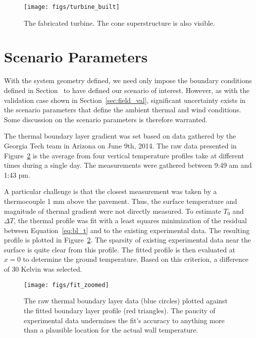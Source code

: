   \begin{figure}
   \centering
   \texttt{[image: figs/turbine\_built]}
   \caption{The fabricated turbine. The cone superstructure is also
   visible.} 
   \label{fig:turbine_built}
  \end{figure}


\section{Scenario Parameters}
\label{subsec:scenario_param}

With the system geometry defined, we need only impose the boundary
conditions defined in Section~\label{sec:bc} to have defined our
scenario of interest. However, as with the validation case shown in
Section~\ref{sec:field_val}, significant uncertainty exists in the
scenario parameters that define the ambient thermal and wind
conditions. Some discussion on the scenario parameters is therefore
warranted. 

The thermal boundary layer gradient was set based on data gathered by 
the Georgia Tech team in Arizona on June 9th, 2014. The raw data
presented in Figure~\ref{fig:thermal_profile_fit} is the average from
four vertical temperature profiles take at different times during a
single day. The measurements were gathered between 9:49 am and 1:43
pm\cite{ann_comm}.  

A particular challenge is that the closest measurement was taken by a 
thermocouple 1 mm above the pavement. Thus, the surface temperature and
magnitude of thermal gradient were not directly measured. To estimate
$T_0$ and $\Delta T$, the thermal profile was fit with a least squares
minimization of the residual between Equation~\ref{eq:bl_t} and to the
existing experimental data. The resulting profile is plotted in
Figure~\ref{fig:thermal_profile_fit}. The sparsity of existing
experimental data near the surface is quite clear from this
profile. The fitted profile is then evaluated at $x=0$ to determine the
ground temperature. Based on this criterion, a difference of 30 Kelvin was
selected.   

 \begin{figure}[!htb]
  \begin{center}
   \texttt{[image: figs/fit\_zoomed]}
   \caption{The raw thermal boundary layer data (blue circles) plotted
   against the fitted boundary layer profile (red triangles). The
   paucity of experimental data undermines the fit's accuracy to
   anything more than a plausible location for the actual wall
   temperature. }  
   \label{fig:thermal_profile_fit}
  \end{center}
 \end{figure}

